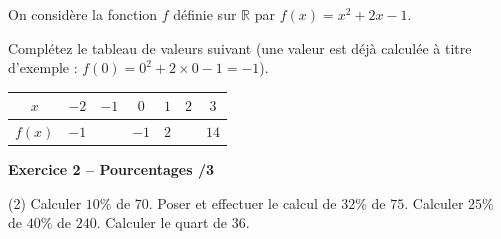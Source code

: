 \documentclass[10pt,a4paper]{article}
\begin{document}
On considère la fonction \(f\) définie sur \(\mathbb{R}\) par \(f(x)=x^2+2x-1\).

Complétez le tableau de valeurs suivant (une valeur est déjà calculée à titre d'exemple : \(f(0)=0^2+2\times 0-1=-1\)).

\begin{center}
    \renewcommand{\arraystretch}{1.5}
    \setlength{\tabcolsep}{0.25cm}
    \begin{tabular}{|*{7}{c|}}
    \hline
    \(x\) & \(-2\) & \(-1\) & \(0\) & \(1\) & \(2\) & \(3\) \\
    \hline
    \(f(x)\) & \(-1\) & & \(-1\) & \(2\) & & \(14\) \\
    \hline
    \end{tabular}
\end{center}

\vspace{3cm}

\textbf{Exercice 2 -- Pourcentages \hfill /3}

\begin{tasks}(2)
    \task Calculer \(10\%\) de \(70\).
    \task Poser et effectuer le calcul de \(32\%\) de \(75\).
    \task Calculer \(25\%\) de \(40\%\) de \(240\).
    \task Calculer le quart de \(36\).
\end{tasks}
\end{document}
